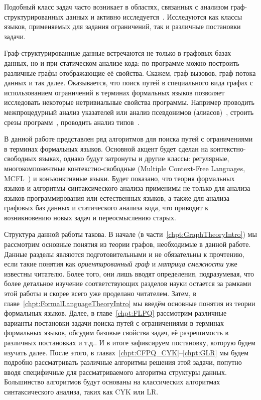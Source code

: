 Подобный класс задач часто возникает в областях, связанных с анализом граф-структурированных данных и активно исследуется~.
Исследуются как классы языков, применяемых для задания ограничений, так и различные постановки задачи.

Граф-структурированные данные встречаются не только в графовых базах данных, но и при статическом анализе кода: по программе можно построить различные графы отображающие её свойства.
Скажем, граф вызовов, граф потока данных и так далее.
Оказывается, что поиск путей в специального вида графах с использованием ограничений в терминах формальных языков позволяет исследовать некоторые нетривиальные свойства программы.
Например проводить межпроцедурный анализ указателей или анализ псевдонимов (алиасов)~, строить срезы программ~, проводить анализ типов~.

В данной работе представлен ряд алгоритмов для поиска путей с ограничениями в терминах формальных языков.
Основной акцент будет сделан на контекстно-свободных языках, однако будут затронуты и другие классы: регулярные, многокомпонентные контекстно-свободные (Multiple Context-Free Languages, MCFL~) и конъюнктивные языки.
Будет показано, что теория формальных языков и алгоритмы синтаксического анализа применимы не только для анализа языков программирования или естественных языков, а также для анализа графовых баз данных и статического анализа кода, что приводит к возникновению новых задач и переосмыслению старых.


Структура данной работы такова.
В начале (в части~\ref{chpt:GraphTheoryIntro}) мы рассмотрим основные понятия из теории графов, необходимые в данной работе. Данные разделы являются подготовительными и не обязательны к прочтению, если такие понятия как \textit{ориентированный граф} и \textit{матрица смежности} уже известны читателю. Более того, они лишь вводят определения, подразумевая, что более детальное изучение соответствующих разделов науки остается за рамками этой работы и скорее всего уже проделано читателем.
Затем, в главе~\ref{chpt:FormalLanguageTheoryIntro} мы введём основные понятия из теории формальных языков.
Далее, в главе~\ref{chpt:FLPQ} рассмотрим различные варианты постановки задачи поиска путей с ограничениями в терминах формальных языков, обсудим базовые свойства задач, её разрешимость в различных постановках и т.д..
И в итоге зафиксируем постановку, которую будем изучать далее.
После этого, в главах~\ref{chpt:CFPQ_CYK}--\ref{chpt:GLR} мы будем подробно рассматривать различные алгоритмы решения этой задачи, попутно вводя специфичные для рассматриваемого алгоритма структуры данных.
Большинство алгоритмов будут основаны на классических алгоритмах синтаксического анализа, таких как CYK или LR.

